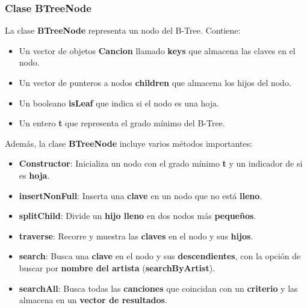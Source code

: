 \documentclass[12pt]{article}
\begin{document}
\begin{flushleft}
            \subsubsection{Clase BTreeNode}
                \noindent\hspace*{4em}La clase \textbf{BTreeNode} representa un nodo del B-Tree. Contiene:
                
                \begin{itemize}[left=4em]  %
                    \item Un vector de objetos \textbf{Cancion} llamado \textbf{keys} que almacena las claves en el nodo.
                    \item Un vector de punteros a nodos \textbf{children} que almacena los hijos del nodo.
                    \item Un booleano \textbf{isLeaf} que indica si el nodo es una hoja.
                    \item Un entero \textbf{t} que representa el grado mínimo del B-Tree.
                \end{itemize}
                
                \noindent\hspace*{4em}Además, la clase \textbf{BTreeNode} incluye varios métodos importantes:
                
                \begin{itemize}[left=4em]  %
                    \item \textbf{Constructor}: Inicializa un nodo con el grado mínimo \textbf{t} y un indicador de si es \textbf{hoja}.
                    \item \textbf{insertNonFull}: Inserta una \textbf{clave} en un nodo que no está \textbf{lleno}.
                    \item \textbf{splitChild}: Divide un \textbf{hijo lleno} en dos nodos más \textbf{pequeños}.
                    \item \textbf{traverse}: Recorre y muestra las \textbf{claves} en el nodo y sus \textbf{hijos}.
                    \item \textbf{search}: Busca una \textbf{clave} en el nodo y sus \textbf{descendientes}, con la opción de buscar por \textbf{nombre del artista} (\textbf{searchByArtist}).
                    \item \textbf{searchAll}: Busca todas las \textbf{canciones} que coincidan con un \textbf{criterio} y las almacena en un \textbf{vector de resultados}.
                \end{itemize}


\end{flushleft}
\end{document}
